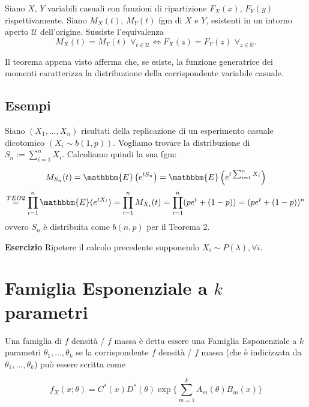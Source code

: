 \begin{thm}
Siano \(X\), \(Y\) variabili casuali con funzioni di ripartizione \(F_X(x)\), \(F_Y(y)\) rispettivamente.
Siano \(M_X(t)\), \(M_Y(t)\) fgm di \(X\) e \(Y\), esistenti in un intorno aperto \(\mathcal{U}\) dell'origine. Sussiste l'equivalenza
\begin{equation}
  M_X(t) = M_Y(t) \,\,\forall_{t \in \mathcal{U}} \iff
  F_X(z) = F_Y(z) \,\,\forall_{z \in \mathbb{R}}.
\end{equation}
\end{thm}

\begin{oss}
Il teorema appena visto afferma che, se esiste, la funzione generatrice dei momenti caratterizza la distribuzione della corrispondente variabile casuale.
\end{oss}

\subsection{Esempi}

\begin{ese}
Siano $(X_1,...,X_n)$ risultati della replicazione di un esperimento casuale dicotomico $(X_i \sim b(1,p))$. Vogliamo trovare la distribuzione di $S_n := \displaystyle\sum_{i=1}^n X_i$. Calcoliamo quindi la sua fgm:

$$M_{S_n}(t) = \mathbbm{E} \left( {e^{t S_n}} \right)  = \mathbbm{E} \left( {e^{t \sum_{i=1}^n X_i}} \right) $$
$$\stackrel{TEO 2}
{=} \displaystyle\prod_{i=1}^n \mathbbm{E}({e^{tX_i}}) = \displaystyle\prod_{i=1}^n M_{X_i}(t) = \displaystyle\prod_{i=1}^n (p e^t + (1-p)) = (p e^t + (1-p))^n$$ ovvero $S_n$ è distribuita come $b(n,p)$ per il Teorema 2.
\end{ese}

\noindent \textbf{Esercizio}
Ripetere il calcolo precedente supponendo $X_i \sim P(\lambda), \forall i$.

\section{Famiglia Esponenziale a $k$ parametri}
Una famiglia di $f$ densità / $f$ massa è detta essere una Famiglia Esponenziale a $k$ parametri $\theta_1,...,\theta_k$ se la corrispondente $f$ densità / $f$ massa (che è indicizzata da $\theta_1,...,\theta_k$) può essere scritta come

$$f_X(x;\theta) = C^*(x) D^*(\theta) \exp \lbrace \displaystyle\sum_{m=1}^k A_m(\theta) B_m (x) \rbrace$$

